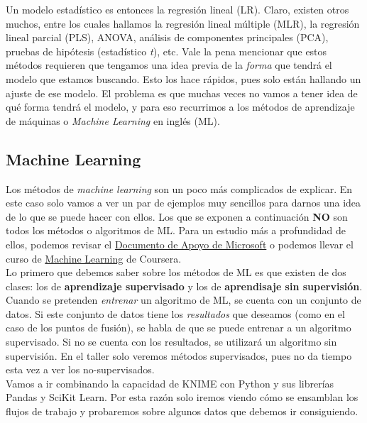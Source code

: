 \documentclass[10pt,letterpaper]{article}
\begin{document}
Un modelo estad\'istico es entonces la regresi\'on lineal (LR). Claro, existen otros muchos, entre los cuales hallamos la regresi\'on lineal m\'ultiple (MLR), la regresi\'on lineal parcial (PLS), ANOVA, an\'alisis de componentes principales (PCA), pruebas de hip\'otesis (estad\'istico \emph{t}), etc. Vale la pena mencionar que estos m\'etodos requieren que tengamos una idea previa de la \textit{forma} que tendr\'a el modelo que estamos buscando. Esto los hace r\'apidos, pues solo est\'an hallando un ajuste de ese modelo. El problema es que muchas veces no vamos a tener idea de qu\'e forma tendr\'a el modelo, y para eso recurrimos a los m\'etodos de aprendizaje de m\'aquinas o \emph{Machine Learning} en ingl\'es (ML).

\subsection{Machine Learning}
Los m\'etodos de \emph{machine learning} son un poco m\'as complicados de explicar. En este caso solo vamos a ver un par de ejemplos muy sencillos para darnos una idea de lo que se puede hacer con ellos. Los que se exponen a continuaci\'on \textbf{NO} son todos los m\'etodos o algoritmos de ML. Para un estudio m\'as a profundidad de ellos, podemos revisar el \href{https://docs.microsoft.com/en-us/azure/machine-learning/machine-learning-algorithm-choice}{Documento de Apoyo de Microsoft} o podemos llevar el curso de \href{https://www.coursera.org/learn/machine-learning}{Machine Learning} de Coursera.\\

Lo primero que debemos saber sobre los m\'etodos de ML es que existen de dos clases: los de \textbf{aprendizaje supervisado} y los de \textbf{aprendisaje sin supervisi\'on}. Cuando se pretenden \emph{entrenar} un algoritmo de ML, se cuenta con un conjunto de datos. Si este conjunto de datos tiene los \emph{resultados} que deseamos (como en el caso de los puntos de fusi\'on), se habla de que se puede entrenar a un algoritmo supervisado. Si no se cuenta con los resultados, se utilizar\'a un algoritmo sin supervisi\'on. En el taller solo veremos m\'etodos supervisados, pues no da tiempo esta vez a ver los no-supervisados.\\

Vamos a ir combinando la capacidad de KNIME con Python y sus librer\'ias Pandas y SciKit Learn. Por esta raz\'on solo iremos viendo c\'omo se ensamblan los flujos de trabajo y probaremos sobre algunos datos que debemos ir consiguiendo.
\end{document}
